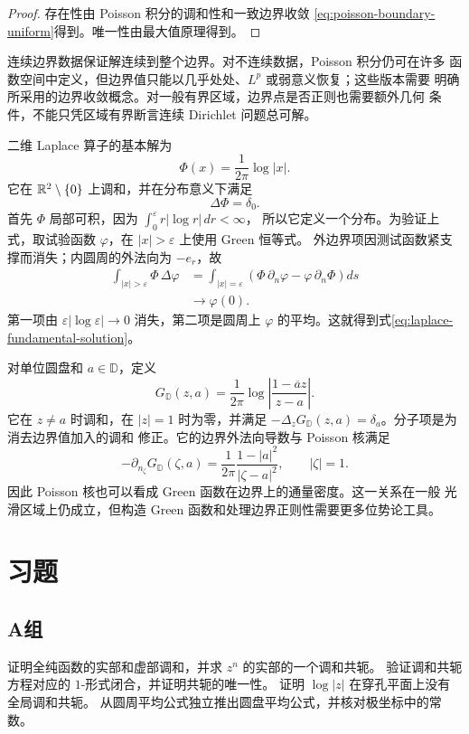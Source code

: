 \begin{proof}
存在性由 Poisson 积分的调和性和一致边界收敛
\eqref{eq:poisson-boundary-uniform}得到。唯一性由最大值原理得到。
\end{proof}

连续边界数据保证解连续到整个边界。对不连续数据，Poisson 积分仍可在许多
函数空间中定义，但边界值只能以几乎处处、$L^p$ 或弱意义恢复；这些版本需要
明确所采用的边界收敛概念。对一般有界区域，边界点是否正则也需要额外几何
条件，不能只凭区域有界断言连续 Dirichlet 问题总可解。

二维 Laplace 算子的基本解为
\[
 \Phi(x)=\frac1{2\pi}\log|x|.
\]
它在 $\mathbb{R}^2\setminus\{0\}$ 上调和，并在分布意义下满足
\begin{equation}\label{eq:laplace-fundamental-solution}
 \Delta\Phi=\delta_0.
\end{equation}
首先 $\Phi$ 局部可积，因为 $\int_0^\varepsilon r|\log r|\,dr<\infty$，
所以它定义一个分布。为验证上式，取试验函数 $\varphi$，在 $|x|>\varepsilon$
上使用 Green 恒等式。
外边界项因测试函数紧支撑而消失；内圆周的外法向为 $-e_r$，故
\begin{align*}
 \int_{|x|>\varepsilon}\Phi\,\Delta\varphi
 &=\int_{|x|=\varepsilon}
 \left(\Phi\,\partial_n\varphi-
 \varphi\,\partial_n\Phi\right)ds\\
 &\longrightarrow \varphi(0).
\end{align*}
第一项由 $\varepsilon|\log\varepsilon|\to0$ 消失，第二项是圆周上
$\varphi$ 的平均。这就得到式\eqref{eq:laplace-fundamental-solution}。

对单位圆盘和 $a\in\mathbb D$，定义
\begin{equation}\label{eq:disk-green-function}
 G_{\mathbb D}(z,a)=\frac1{2\pi}
 \log\left|\frac{1-\overline a z}{z-a}\right|.
\end{equation}
它在 $z\ne a$ 时调和，在 $|z|=1$ 时为零，并满足
$-\Delta_zG_{\mathbb D}(z,a)=\delta_a$。分子项是为消去边界值加入的调和
修正。它的边界外法向导数与 Poisson 核满足
\[
 -\partial_{n_\zeta}G_{\mathbb D}(\zeta,a)
 =\frac1{2\pi}\frac{1-|a|^2}{|\zeta-a|^2},
 \qquad |\zeta|=1.
\]
因此 Poisson 核也可以看成 Green 函数在边界上的通量密度。这一关系在一般
光滑区域上仍成立，但构造 Green 函数和处理边界正则性需要更多位势论工具。

\section*{习题}

\subsection*{A组}
\begin{enumerate}[label=\textbf{\thechapter.\arabic*.}]
证明全纯函数的实部和虚部调和，并求 $z^n$ 的实部的一个调和共轭。
验证调和共轭方程对应的 $1$-形式闭合，并证明共轭的唯一性。
证明 $\log|z|$ 在穿孔平面上没有全局调和共轭。
从圆周平均公式独立推出圆盘平均公式，并核对极坐标中的常数。
\end{enumerate}

